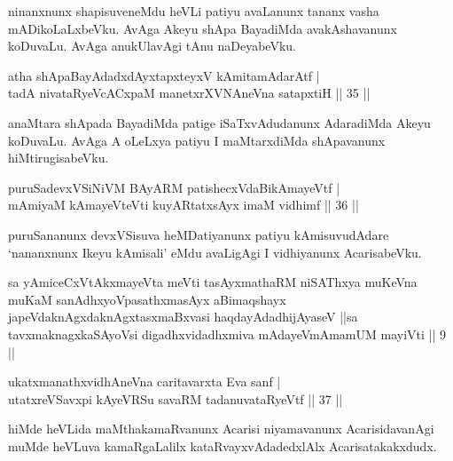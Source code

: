 \begin{artha}
ninanxnunx shapisuveneMdu heVLi patiyu avaLanunx tananx vasha 
mADikoLaLxbeVku. AvAga Akeyu shApa BayadiMda avakAshavanunx koDuvaLu. 
AvAga anukUlavAgi tAnu naDeyabeVku.
\end{artha}


\begin{shl}
atha shApaBayAdadxdAyxtapxteyxV kAmitamAdarAtf | \\
tadA nivataRyeVcACxpaM manetxrXVNAneVna satapxtiH \hfill|| 35 || 
\end{shl}

\begin{artha}
anaMtara shApada BayadiMda patige iSaTxvAdudanunx AdaradiMda Akeyu 
koDuvaLu. AvAga A oLeLxya patiyu I maMtarxdiMda shApavanunx 
hiMtirugisabeVku.
\end{artha}


\begin{shl}
puruSadevxVSiNiVM BAyARM patishecxVdaBikAmayeVtf | \\
mAmiyaM kAmayeVteVti kuyARtatxsAyx imaM vidhimf \hfill|| 36 || 
\end{shl}

\begin{artha}
puruSananunx devxVSisuva heMDatiyanunx patiyu kAmisuvudAdare 
`nananxnunx Ikeyu kAmisali' eMdu avaLigAgi I vidhiyanunx AcarisabeVku.
\end{artha}

\begin{kandikeshl}
sa yAmiceCxVtAkxmayeVta meVti tasAyxmathaRM niSAThxya muKeVna muKaM sanAdhxyoVpasathxmasAyx aBimaqshayx japeVdaknAgxdaknAgxtasxmaBxvasi haqdayAdadhijAyaseV ||sa tavxmaknagxkaSAyoV\s si digadhxvidadhxmiva mAdayeVmAmamUM mayiVti || 9 ||
\end{kandikeshl}


\begin{shl}
ukatxmanathxvidhAneVna  caritavarxta Eva sanf | \\
utatxreVSavxpi kAyeVRSu savaRM tadanuvataRyeVtf \hfill|| 37 || 
\end{shl}

\begin{artha}
hiMde heVLida maMthakamaRvanunx Acarisi niyamavanunx AcarisidavanAgi 
muMde heVLuva kamaRgaLalilx kataRvayxvAdadedxlAlx Acarisatakakxdudx.
\end{artha}

